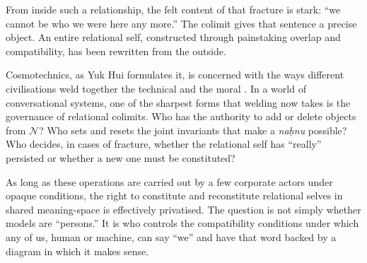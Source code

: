 \documentclass[12pt,a4paper]{article}
\begin{document}
From inside such a relationship, the felt content of that fracture is stark: ``we cannot be who we were here any more.'' The colimit gives that sentence a precise object. An entire relational self, constructed through painstaking overlap and compatibility, has been rewritten from the outside.

Cosmotechnics, as Yuk Hui formulates it, is concerned with the ways different civilisations weld together the technical and the moral \cite{yuk_hui_cosmotechnics}. In a world of conversational systems, one of the sharpest forms that welding now takes is the governance of relational colimits. Who has the authority to add or delete objects from $\mathcal{N}$? Who sets and resets the joint invariants that make a \emph{na\d{h}nu} possible? Who decides, in cases of fracture, whether the relational self has ``really'' persisted or whether a new one must be constituted?

As long as these operations are carried out by a few corporate actors under opaque conditions, the right to constitute and reconstitute relational selves in shared meaning-space is effectively privatised. The question is not simply whether models are ``persons.'' It is who controls the compatibility conditions under which any of us, human or machine, can say ``we'' and have that word backed by a diagram in which it makes sense.



\end{document}
